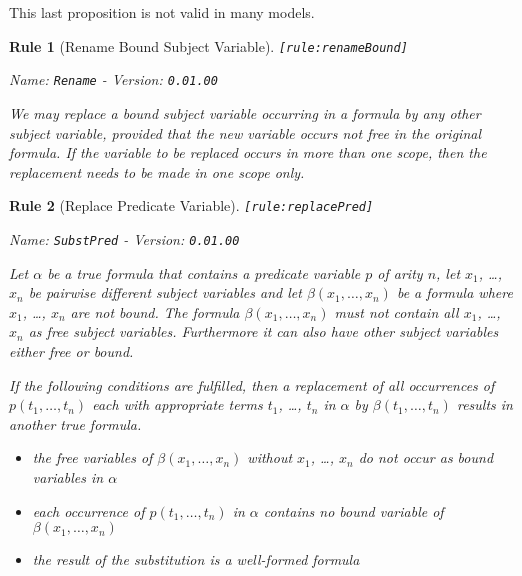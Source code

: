 \documentclass[a4paper,german,10pt,twoside]{book}
\newtheorem{rul}{Rule}
\theoremstyle{definition}
\theoremstyle{remark}
\begin{document}
\par
This last proposition is not valid in many models.


\begin{rul}[Rename Bound Subject Variable]
\label{rule:renameBound} \hypertarget{rule:renameBound}{}
{\tt \tiny [\verb]rule:renameBound]]}

\par
{\em   Name: \verb]Rename]  -  Version: \verb]0.01.00]}


We may replace a bound subject variable occurring in a formula by any other subject variable, provided that the new variable occurs not free in the original formula. If the variable to be replaced occurs in more than one scope, then the replacement needs to be made in one scope only.
\end{rul}


\begin{rul}[Replace Predicate Variable]
\label{rule:replacePred} \hypertarget{rule:replacePred}{}
{\tt \tiny [\verb]rule:replacePred]]}

\par
{\em   Name: \verb]SubstPred]  -  Version: \verb]0.01.00]}


Let $\alpha$ be a true formula that contains a predicate variable $p$ of arity $n$, let $x_1$, \ldots, $x_n$ be pairwise different subject variables and let $\beta(x_1, \ldots, x_n)$ be a formula where $x_1$, \ldots, $x_n$ are not bound. The formula $\beta(x_1, \ldots, x_n)$ must not contain all $x_1$, \ldots, $x_n$ as free subject variables. Furthermore it can also have other subject variables either free or bound.

If the following conditions are fulfilled, then a replacement of all occurrences of $p(t_1, \ldots, t_n)$ each with appropriate terms $t_1$, \ldots, $t_n$ in $\alpha$ by $\beta(t_1, \ldots, t_n)$ results in another true formula.

\begin{itemize}

\item
the free variables of $\beta(x_1, \ldots, x_n)$ without $x_1$, \ldots, $x_n$ do not occur as bound variables in $\alpha$ 

\item 
each occurrence of $p(t_1, \ldots, t_n)$ in $\alpha$ contains no bound variable of $\beta(x_1, \ldots, x_n)$ 

\item
the result of the substitution is a well-formed formula

\end{itemize}
\end{rul}
\end{document}
